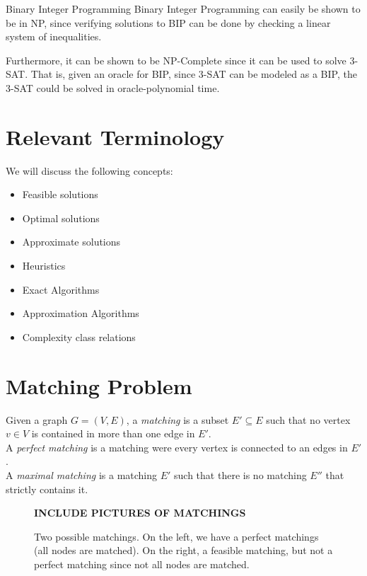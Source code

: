 \documentclass[../open-optimization/open-optimization.tex]{subfiles}
\begin{document}
\begin{general}{Binary Integer Programming}{\npcomplete}
Binary Integer Programming can easily be shown to be in NP, since verifying solutions to BIP can be done by checking a linear system of inequalities.  

Furthermore, it can be shown to be NP-Complete since it can be used to solve 3-SAT.  That is, given an oracle for BIP, since 3-SAT can be modeled as a BIP,  the 3-SAT could be solved in oracle-polynomial time.
\end{general}

\section{Relevant Terminology}
We will discuss the following concepts:
\begin{itemize}
\item Feasible solutions
\item Optimal solutions
\item Approximate solutions
\item Heuristics
\item Exact Algorithms
\item Approximation Algorithms
\item Complexity class relations
\end{itemize}


\section{Matching Problem}




\begin{definition}
Given a graph $G = (V,E)$, a \emph{matching} is a subset $E' \subseteq E$ such that no vertex $v \in V$ is contained in more than one edge in $E'$.  \\
A \emph{perfect matching} is a matching were every vertex is connected to an edges in $E'$.\\
A \emph{maximal matching} is a matching $E'$ such that there is no matching $E''$ that strictly contains it.
\end{definition}


\begin{figure}[H]
\begin{center}
\textbf{INCLUDE PICTURES OF MATCHINGS}
\end{center}
\label{fig:matching}
\caption{Two possible matchings.  On the left, we have a perfect matchings (all nodes are matched).  On the right, a feasible matching, but not a perfect matching since not all nodes are matched.}

\end{figure}
\end{document}
